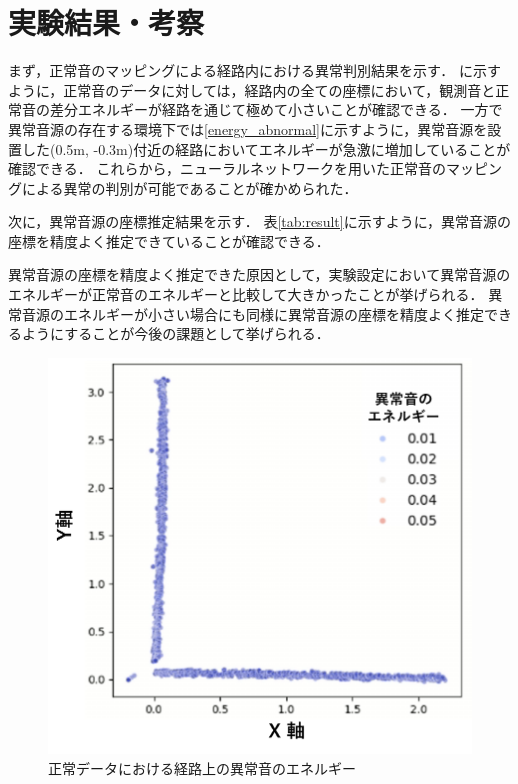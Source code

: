 \documentclass[../main]{subfiles}
\begin{document}
\graphicspath{{../figures}}

\section{実験結果・考察}
まず，正常音のマッピングによる経路内における異常判別結果を示す．
に示すように，正常音のデータに対しては，経路内の全ての座標において，観測音と正常音の差分エネルギーが経路を通じて極めて小さいことが確認できる．
一方で異常音源の存在する環境下では\ref{energy_abnormal}に示すように，異常音源を設置した(0.5m, -0.3m)付近の経路においてエネルギーが急激に増加していることが確認できる．
これらから，ニューラルネットワークを用いた正常音のマッピングによる異常の判別が可能であることが確かめられた．

次に，異常音源の座標推定結果を示す．
表\ref{tab:result}に示すように，異常音源の座標を精度よく推定できていることが確認できる．

異常音源の座標を精度よく推定できた原因として，実験設定において異常音源のエネルギーが正常音のエネルギーと比較して大きかったことが挙げられる．
異常音源のエネルギーが小さい場合にも同様に異常音源の座標を精度よく推定できるようにすることが今後の課題として挙げられる．

\begin{figure}[tb]
  \centering
  \includegraphics[keepaspectratio, width=0.8\linewidth]{energy_normal.pdf}
  \caption{正常データにおける経路上の異常音のエネルギー}
\end{figure}
\end{document}
